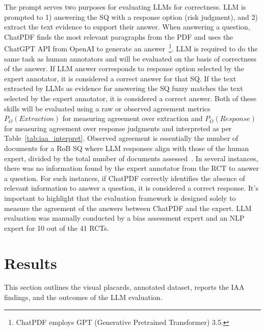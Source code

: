 \documentclass[sn-mathphys,Numbered]{sn-jnl}%
\theoremstyle{thmstyleone}%
\theoremstyle{thmstyletwo}%
\theoremstyle{thmstylethree}%
\begin{document}
The prompt serves two purposes for evaluating LLMs for correctness.
LLM is prompted to 1) answering the SQ with a response option (risk judgment), and 2) extract the text evidence to support their answer.
When answering a question, ChatPDF finds the most relevant paragraphs from the PDF and uses the ChatGPT API from OpenAI to generate an answer~\footnote{ChatPDF employs GPT (Generative Pretrained Transformer) 3.5.}.
LLM is required to do the same task as human annotators and will be evaluated on the basis of correctness of the answer.
If LLM answer corresponds to response option selected by the expert annotator, it is considered a correct answer for that SQ. 
If the text extracted by LLMs as evidence for answering the SQ fuzzy matches the text selected by the expert annotator, it is considered a correct answer.
Both of these skills will be evaluated using a raw or observed agreement metrics $P_{O} (Extraction)$  for measuring agreement over extraction and $P_{O} (Response)$ for measuring agreement over response judgments and interpreted as per Table~\ref{tab:iaa_interpret}. 
Observed agreement is essentially the number of documents for a RoB SQ where LLM responses align with those of the human expert, divided by the total number of documents assessed~\cite{artstein2017inter}.
In several instances, there was no information found by the expert annotator from the RCT to answer a question. 
For such instances, if ChatPDF correctly identifies the absence of relevant information to answer a question, it is considered a correct response.
It's important to highlight that the evaluation framework is designed solely to measure the agreement of the answers between ChatPDF and the expert.
LLM evaluation was manually conducted by a bias assessment expert and an NLP expert for 10 out of the 41 RCTs.
%
%
%
\section{Results}
\label{sec:results}
%
This section outlines the visual placards, annotated dataset, reports the IAA findings, and the outcomes of the LLM evaluation.
%
%
%
\end{document}
